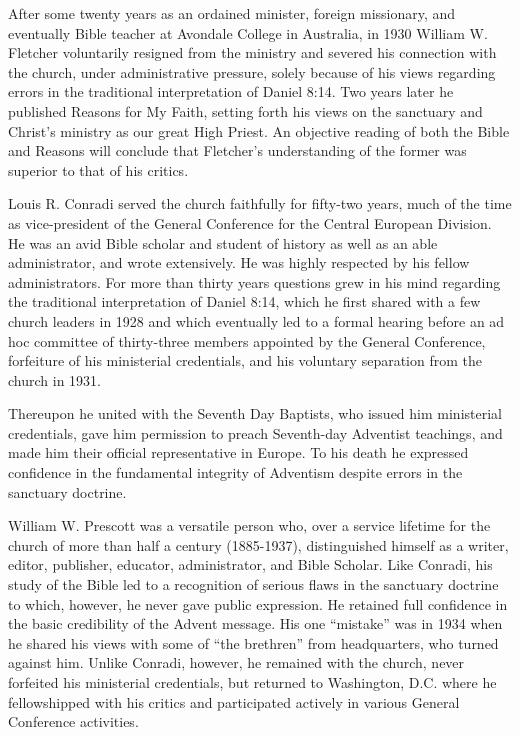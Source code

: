 After some twenty years as an ordained minister, foreign missionary, and
eventually Bible teacher at Avondale College in Australia, in 1930 William
W. Fletcher voluntarily resigned from the ministry and severed his
connection with the church, under administrative pressure, solely because of
his views regarding errors in the traditional interpretation of Daniel 8:14.
Two years later he published Reasons for My Faith, setting forth his views
on the sanctuary and Christ's ministry as our great High Priest. An
objective reading of both the Bible and Reasons will conclude that
Fletcher's understanding of the former was superior to that of his
critics.\cite{22}

Louis R. Conradi served the church faithfully for fifty-two years, much of
the time as vice-president of the General Conference for the Central
European Division. He was an avid Bible scholar and student of history as
well as an able administrator, and wrote extensively. He was highly
respected by his fellow administrators. For more than thirty years questions
grew in his mind regarding the traditional interpretation of Daniel 8:14,
which he first shared with a few church leaders in 1928 and which eventually
led to a formal hearing before an ad hoc committee of thirty-three members
appointed by the General Conference, forfeiture of his ministerial
credentials, and his voluntary separation from the church in 1931. 

Thereupon he united with the Seventh Day Baptists, who issued him
ministerial credentials, gave him permission to preach Seventh-day Adventist
teachings, and made him their official representative in Europe. To his 
death he expressed confidence in the fundamental integrity of Adventism
despite errors in the sanctuary doctrine.

William W. Prescott was a versatile person who, over a service lifetime for
the church of more than half a century (1885-1937), distinguished himself as
a writer, editor, publisher, educator, administrator, and Bible Scholar.
Like Conradi, his study of the Bible led to a recognition of serious flaws
in the sanctuary doctrine to which, however, he never gave public
expression. He retained full confidence in the basic credibility of the
Advent message. His one ``mistake'' was in 1934 when he shared his views with
some of ``the brethren'' from headquarters, who turned against him. Unlike
Conradi, however, he remained with the church, never forfeited his
ministerial credentials, but returned to Washington, D.C. where he
fellowshipped with his critics and participated actively in various General
Conference activities.

